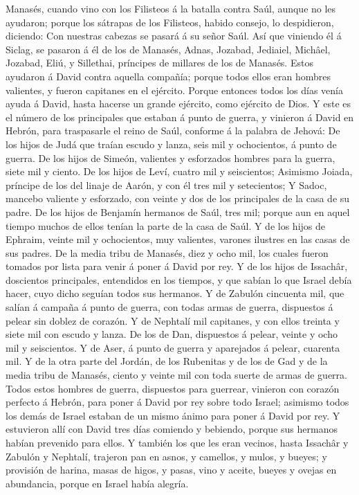 Manasés, cuando vino con los Filisteos á la batalla contra Saúl, aunque
no les ayudaron; porque los sátrapas de los Filisteos, habido consejo,
lo despidieron, diciendo: Con nuestras cabezas se pasará á su señor
Saúl.  Así que viniendo él á Siclag, se pasaron á él de
los de Manasés, Adnas, Jozabad, Jediaiel, Michâel, Jozabad, Eliú, y
Sillethai, príncipes de millares de los de Manasés. 
Estos ayudaron á David contra aquella compañía; porque todos ellos eran
hombres valientes, y fueron capitanes en el ejército. 
Porque entonces todos los días venía ayuda á David, hasta hacerse un
grande ejército, como ejército de Dios.  Y este es el
número de los principales que estaban á punto de guerra, y vinieron á
David en Hebrón, para traspasarle el reino de Saúl, conforme á la
palabra de Jehová:  De los hijos de Judá que traían
escudo y lanza, seis mil y ochocientos, á punto de guerra.
 De los hijos de Simeón, valientes y esforzados hombres
para la guerra, siete mil y ciento.  De los hijos de
Leví, cuatro mil y seiscientos;  Asimismo Joiada,
príncipe de los del linaje de Aarón, y con él tres mil y setecientos;
 Y Sadoc, mancebo valiente y esforzado, con veinte y dos
de los principales de la casa de su padre.  De los hijos
de Benjamín hermanos de Saúl, tres mil; porque aun en aquel tiempo
muchos de ellos tenían la parte de la casa de Saúl.  Y de
los hijos de Ephraim, veinte mil y ochocientos, muy valientes, varones
ilustres en las casas de sus padres.  De la media tribu
de Manasés, diez y ocho mil, los cuales fueron tomados por lista para
venir á poner á David por rey.  Y de los hijos de
Issachâr, doscientos principales, entendidos en los tiempos, y que
sabían lo que Israel debía hacer, cuyo dicho seguían todos sus hermanos.
 Y de Zabulón cincuenta mil, que salían á campaña á punto
de guerra, con todas armas de guerra, dispuestos á pelear sin doblez de
corazón.  Y de Nephtalí mil capitanes, y con ellos
treinta y siete mil con escudo y lanza.  De los de Dan,
dispuestos á pelear, veinte y ocho mil y seiscientos.  Y
de Aser, á punto de guerra y aparejados á pelear, cuarenta mil.
 Y de la otra parte del Jordán, de los Rubenitas y de los
de Gad y de la media tribu de Manasés, ciento y veinte mil con toda
suerte de armas de guerra.  Todos estos hombres de
guerra, dispuestos para guerrear, vinieron con corazón perfecto á
Hebrón, para poner á David por rey sobre todo Israel; asimismo todos los
demás de Israel estaban de un mismo ánimo para poner á David por rey.
 Y estuvieron allí con David tres días comiendo y
bebiendo, porque sus hermanos habían prevenido para ellos.
 Y también los que les eran vecinos, hasta Issachâr y
Zabulón y Nephtalí, trajeron pan en asnos, y camellos, y mulos, y
bueyes; y provisión de harina, masas de higos, y pasas, vino y aceite,
bueyes y ovejas en abundancia, porque en Israel había alegría.


